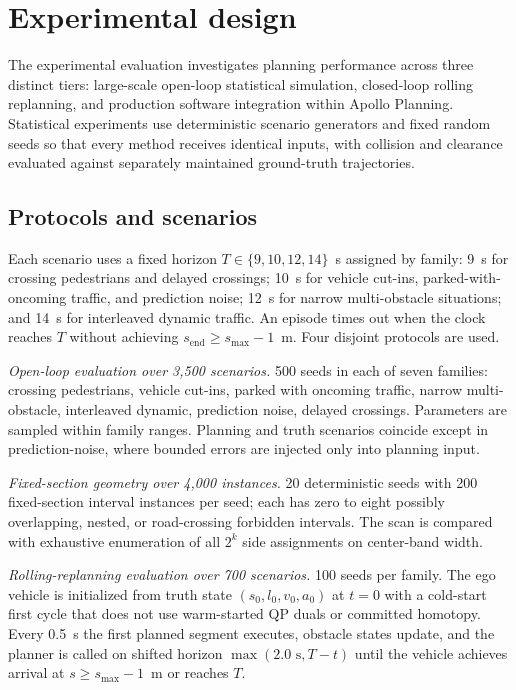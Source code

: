 \section{Experimental design}
\label{sec:experimental_design}

The experimental evaluation investigates planning performance across three distinct tiers: large-scale open-loop statistical simulation, closed-loop rolling replanning, and production software integration within Apollo Planning. Statistical experiments use deterministic scenario generators and fixed random seeds so that every method receives identical inputs, with collision and clearance evaluated against separately maintained ground-truth trajectories.

\subsection{Protocols and scenarios}
\label{sec:protocols_scenarios}

Each scenario uses a fixed horizon $T\in\{9,10,12,14\}$~s assigned by family: 9~s for crossing pedestrians and delayed crossings; 10~s for vehicle cut-ins, parked-with-oncoming traffic, and prediction noise; 12~s for narrow multi-obstacle situations; and 14~s for interleaved dynamic traffic. An episode times out when the clock reaches $T$ without achieving $s_{\mathrm{end}}\geq s_{\max}-1$~m. Four disjoint protocols are used.

\emph{Open-loop evaluation over 3,500 scenarios.} 500 seeds in each of seven families: crossing pedestrians, vehicle cut-ins, parked with oncoming traffic, narrow multi-obstacle, interleaved dynamic, prediction noise, delayed crossings. Parameters are sampled within family ranges. Planning and truth scenarios coincide except in prediction-noise, where bounded errors are injected only into planning input.

\emph{Fixed-section geometry over 4,000 instances.} 20 deterministic seeds with 200 fixed-section interval instances per seed; each has zero to eight possibly overlapping, nested, or road-crossing forbidden intervals. The scan is compared with exhaustive enumeration of all $2^k$ side assignments on center-band width.

\emph{Rolling-replanning evaluation over 700 scenarios.} 100 seeds per family. The ego vehicle is initialized from truth state $(s_0,l_0,v_0,a_0)$ at $t=0$ with a cold-start first cycle that does not use warm-started QP duals or committed homotopy. Every 0.5~s the first planned segment executes, obstacle states update, and the planner is called on shifted horizon $\max(2.0\text{ s},T-t)$ until the vehicle achieves arrival at $s\geq s_{\max}-1$~m or reaches $T$.

